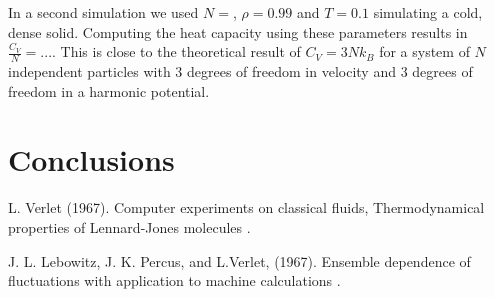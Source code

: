 \documentclass[twoside]{article}
\begin{document}
	In a second simulation we used $N=$, $\rho=0.99$ and $T=0.1$ simulating a cold, dense solid. Computing the heat capacity using these parameters results in $\frac{C_V}{N} = ... $. This is close to the theoretical result of $C_V = 3 N k_B$ for a system of $N$ independent particles with 3 degrees of freedom in velocity and 3 degrees of freedom in a harmonic potential.
	
	\section{Conclusions}
	\lipsum[4]
	
	
	
	\begin{thebibliography}{1}
		L.   Verlet  (1967). 
		\newblock Computer  experiments   on   classical   fluids, 
		\newblock Thermodynamical properties of Lennard-Jones molecules
		.
		
		J. L. Lebowitz, J. K. Percus, and L.Verlet, (1967).
		\newblock Ensemble dependence of fluctuations with application
		to machine calculations
		.
	\end{thebibliography}
	
\end{document}
